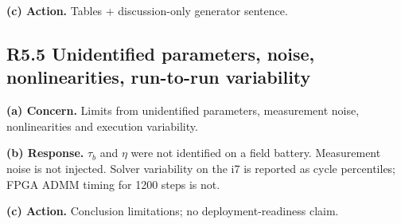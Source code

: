 \documentclass[11pt]{article}
\begin{document}
\textbf{(c) Action.} Tables + discussion-only generator sentence.

\subsection*{R5.5 Unidentified parameters, noise, nonlinearities, run-to-run variability}
\textbf{(a) Concern.} Limits from unidentified parameters, measurement noise, nonlinearities and execution variability.

\textbf{(b) Response.} $\tau_b$ and $\eta$ were not identified on a field battery. Measurement noise is not injected. Solver variability on the i7 is reported as cycle percentiles; FPGA ADMM timing for 1200 steps is not.

\textbf{(c) Action.} Conclusion limitations; no deployment-readiness claim.
\end{document}
